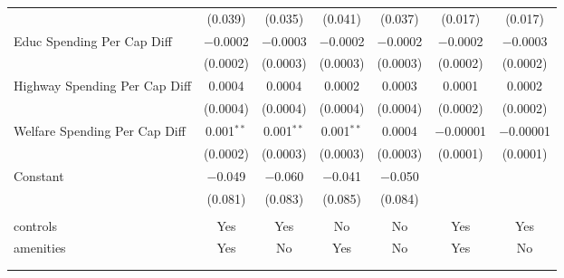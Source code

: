 \begin{table}[!htbp]
\begin{tabular}{@{\extracolsep{5pt}}lcccccc}
  & (0.039) & (0.035) & (0.041) & (0.037) & (0.017) & (0.017) \\ 
  Educ Spending Per Cap Diff & $-$0.0002 & $-$0.0003 & $-$0.0002 & $-$0.0002 & $-$0.0002 & $-$0.0003 \\ 
  & (0.0002) & (0.0003) & (0.0003) & (0.0003) & (0.0002) & (0.0002) \\ 
  Highway Spending Per Cap Diff & 0.0004 & 0.0004 & 0.0002 & 0.0003 & 0.0001 & 0.0002 \\ 
  & (0.0004) & (0.0004) & (0.0004) & (0.0004) & (0.0002) & (0.0002) \\ 
  Welfare Spending Per Cap Diff & 0.001$^{**}$ & 0.001$^{**}$ & 0.001$^{**}$ & 0.0004 & $-$0.00001 & $-$0.00001 \\ 
  & (0.0002) & (0.0003) & (0.0003) & (0.0003) & (0.0001) & (0.0001) \\ 
  Constant & $-$0.049 & $-$0.060 & $-$0.041 & $-$0.050 &  &  \\ 
  & (0.081) & (0.083) & (0.085) & (0.084) &  &  \\ 
 \hline \\[-1.8ex] 
controls & Yes & Yes & No & No & Yes & Yes \\ 
amenities & Yes & No & Yes & No & Yes & No \\ 
\hline \\[-1.8ex] 
\hline 
\hline \\[-1.8ex] 
\end{tabular} 
\end{table} 
